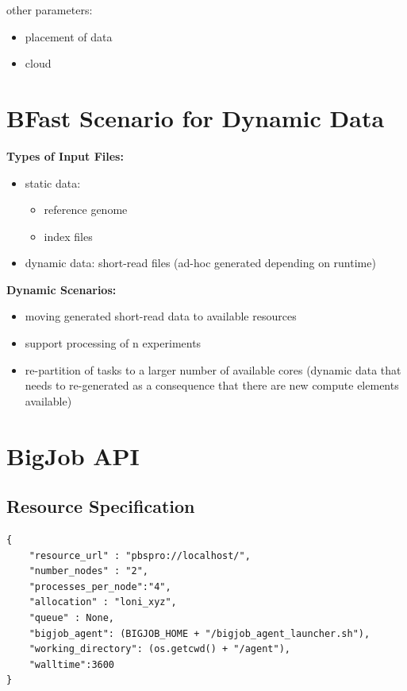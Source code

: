 \documentclass[]{article}
\begin{document}
other parameters:
\begin{itemize}
	\item placement of data
	\item cloud
\end{itemize}

\section{BFast Scenario for Dynamic Data}

\textbf{Types of Input Files:}
\begin{itemize}
	\item static data: 
	\begin{itemize}
		\item reference genome
		\item index files
	\end{itemize}
	\item dynamic data: short-read files (ad-hoc generated depending on runtime)
\end{itemize}

\noindent
\textbf{Dynamic Scenarios:}
\begin{itemize}
	\item moving generated short-read data to available resources
	
	\item support processing of n experiments 

	\item re-partition of tasks to a larger number of available cores (dynamic data that needs to re-generated as a consequence that there are new compute elements available)

\end{itemize}

\section{BigJob API}
\label{sec:api}
\subsection{Resource Specification}


\begin{verbatim}
{
    "resource_url" : "pbspro://localhost/", 
    "number_nodes" : "2", 
    "processes_per_node":"4", 
    "allocation" : "loni_xyz", 
    "queue" : None, 
    "bigjob_agent": (BIGJOB_HOME + "/bigjob_agent_launcher.sh"), 
    "working_directory": (os.getcwd() + "/agent"), 
    "walltime":3600 
}
\end{verbatim}
\end{document}
